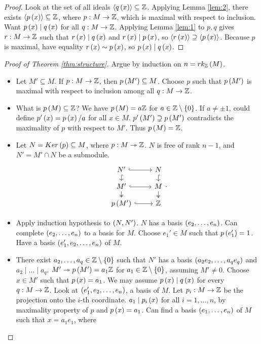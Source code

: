 \pagebreak

\begin{proof}
Look at the set of all ideals $ \left\langle q\left( x \right) \right\rangle \subseteq \mathbb{Z} $. Applying Lemma \ref{lem:2}, there exists $ \left\langle p\left( x \right) \right\rangle \subseteq \mathbb{Z} $, where $ p : M \to \mathbb{Z} $, which is maximal with respect to inclusion. Want $ p\left( x \right) \mid q\left( x \right) $ for all $ q : M \to \mathbb{Z} $. Applying Lemma \ref{lem:1} to $ p, q $ gives $ r : M \to \mathbb{Z} $ such that $ r\left( x \right) \mid q\left( x \right) $ and $ r\left( x \right) \mid p\left( x \right) $, so $ \left\langle r\left( x \right) \right\rangle \supseteq \left\langle p\left( x \right) \right\rangle $. Because $ p $ is maximal, have equality $ r\left( x \right) \sim p\left( x \right) $, so $ p\left( x \right) \mid q\left( x \right) $.
\end{proof}

\begin{proof}[Proof of Theorem \ref{thm:structure}]
Argue by induction on $ n = rk_{\mathbb{Z}}\left( M \right) $.
\begin{itemize}
\item Let $ M' \subseteq M $. If $ p : M \to \mathbb{Z} $, then $ p\left( M' \right) \subseteq M $. Choose $ p $ such that $ p\left( M' \right) $ is maximal with respect to inclusion among all $ q : M \to \mathbb{Z} $.
\item What is $ p\left( M \right) \subseteq \mathbb{Z} $? We have $ p\left( M \right) = a\mathbb{Z} $ for $ a \in \mathbb{Z} \setminus \left\{ 0 \right\} $. If $ a \ne \pm 1 $, could define $ p'\left( x \right) = p\left( x \right) / a $ for all $ x \in M $. $ p'\left( M' \right) \supsetneq p\left( M' \right) $ contradicts the maximality of $ p $ with respect to $ M' $. Thus $ p\left( M \right) = \mathbb{Z} $.
\item Let $ N = Ker\left( p \right) \subseteq M $, where $ p : M \twoheadrightarrow \mathbb{Z} $. $ N $ is free of rank $ n - 1 $, and $ N' = M' \cap N $ be a submodule.
$$
\begin{tikzcd}[row sep=small]
N' \arrow[hookrightarrow]{r} \arrow[hookrightarrow]{d} & N \arrow[hookrightarrow]{d} \\
M' \arrow[hookrightarrow]{r} \arrow[twoheadrightarrow]{d} & M \arrow[twoheadrightarrow]{d} \\
p\rb{M'} \arrow[hookrightarrow]{r} & \Z
\end{tikzcd}.
$$
\item Apply induction hypothesis to $ \left( N, N' \right) $. $ N $ has a basis $ \left( e_2, \dots, e_n \right) $. Can complete $ \left( e_2, \dots, e_n \right) $ to a basis for $ M $. Choose $ e_1' \in M $ such that $ p\left( e_1' \right) = 1 $. Have a basis $ \left( e_1', e_2, \dots, e_n \right) $ of $ M $.
\item There exist $ a_2, \dots, a_q \in \mathbb{Z} \setminus \left\{ 0 \right\} $ such that $ N' $ has a basis $ \left( a_2e_2, \dots, a_qe_q \right) $ and $ a_2 \mid \dots \mid a_q $. $ M' \twoheadrightarrow p\left( M' \right) = a_1\mathbb{Z} $ for $ a_1 \in \mathbb{Z} \setminus \left\{ 0 \right\} $, assuming $ M' \ne 0 $. Choose $ x \in M' $ such that $ p\left( x \right) = a_1 $. We may assume $ p\left( x \right) \mid q\left( x \right) $ for every $ q : M \to \mathbb{Z} $. Look at $ \left( e_1', e_2, \dots, e_n \right) $, a basis of $ M $. Let $ p_i : M \to \mathbb{Z} $ be the projection onto the $ i $-th coordinate. $ a_1 \mid p_i\left( x \right) $ for all $ i = 1, \dots, n $, by maximality property of $ p $ and $ p\left( x \right) = a_1 $. Can find a basis $ \left( e_1, \dots, e_n \right) $ of $ M $ such that $ x = a_1e_1 $, where

\end{itemize}
\end{proof}
